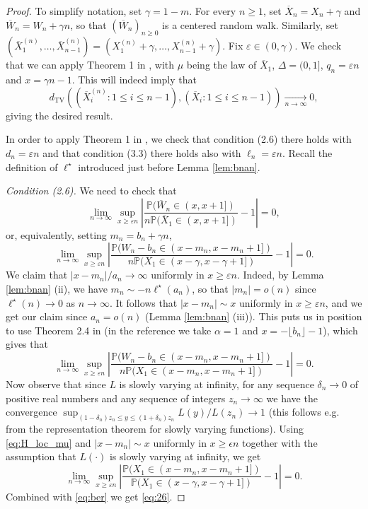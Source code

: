 \documentclass[a4paper,11pt]{article}
\DeclareRobustCommand{\P}{\mathbb{P}}
\DeclareRobustCommand{\to}{\xrightarrow[n\rightarrow \infty]{}}
\begin{document}
\begin{proof}
To simplify notation, set $\gamma=1-m$. For every $n \geq 1$, set $\overline{X}_{n}=X_{n}+\gamma$ and $\overline{W}_{n}=W_{n}+\gamma n$, so that $(\overline{W}_{n})_{n \geq 0}$ is a centered random walk. Similarly, set  $(\overline{X}_1^{(n)}, \ldots ,\overline{X}_{n-1}^{(n)})=(X_1^{(n)}+\gamma, \ldots ,X_{n-1}^{(n)}+\gamma)$. Fix $\varepsilon \in (0,\gamma)$. We check that we can apply Theorem 1 in \cite{AL11}, with $\mu$ being the law of $\overline{X}_{1}$, $\Delta=(0,1]$, $q_{n}=\varepsilon n$ and $x=\gamma n-1$. This will indeed imply that 
$$
                    d_{\mathrm{TV}}\left((\overline{X}_i^{(n)}:1\leq i\leq n-1),(\overline{X}_i:1\leq i\leq n-1)\right) \to 0,
$$
giving the desired result.

In order to apply  Theorem 1 in \cite{AL11}, we check that condition (2.6) there holds with $d_{n}=\varepsilon n$ and that condition (3.3) there holds also with $\ell_{n}=\varepsilon n$. Recall the definition of $\ell^\star$ introduced just before Lemma \ref{lem:bnan}.

\emph{Condition (2.6).} We need to check that
$$
\lim_{n \rightarrow \infty} \sup_{x \geq \varepsilon n} \left| \frac{\P(\overline{W}_{n} \in (x,x+1])}{ n \P(\overline{X}_{1} \in (x,x+1])} -1 \right|=0,
$$
or, equivalently, setting $m_{n}=b_{n}+\gamma n$,
\begin{equation}
\label{eq:26} 
\lim_{n \rightarrow \infty} \sup_{x \geq \varepsilon n} \left| \frac{\P({W}_{n}-b_{n} \in (x-m_{n},x-m_{n}+1])}{ n \P({X}_{1} \in (x-\gamma,x-\gamma+1])} -1 \right|=0.
\end{equation}
We claim that $|x-m_{n}|/a_{n} \rightarrow \infty$  uniformly in $x \geq \varepsilon n$. Indeed, by Lemma \ref{lem:bnan} (ii), we have $m_{n} \sim -n \ell^{\star}(a_{n})$, so that $|m_{n}|=o(n)$ since $\ell^{\star}(n) \rightarrow 0$ as $n \rightarrow \infty$. It follows that $|x-m_{n}| \sim x $  uniformly in $x \geq \varepsilon n$, and we get our claim since $a_n = o(n)$ (Lemma \ref{lem:bnan} (iii)). This puts us in position to use Theorem 2.4 in \cite{Ber17} (in the reference we take $\alpha= 1$ and $x=-\lfloor b_n \rfloor -1$), which gives that 
\begin{equation}
\label{eq:ber}\lim_{n \rightarrow \infty} \sup_{x \geq \varepsilon n} \left| \frac{\P({W}_{n}-b_{n} \in (x-m_{n},x-m_{n}+1])}{ n \P({X}_{1} \in(x-m_{n},x-m_{n}+1])} -1 \right|=0.
\end{equation}
Now observe that since $L$ is slowly varying at infinity, for any sequence $\delta_n \rightarrow 0$ of positive real numbers and any sequence of integers $z_n \rightarrow \infty$ we have the convergence $\sup_{(1-\delta_n) z_n \leq y \leq (1+\delta_n) z_n} L(y)/L(z_n) \rightarrow 1$ (this follows e.g. from the representation theorem for slowly varying functions). Using \eqref{eq:H_loc_mu} and $|x-m_{n}| \sim x$ uniformly in $x\geq \epsilon n$ together with the assumption that $L(\cdot)$ is slowly varying at infinity, we get
$$ \lim_{n \rightarrow \infty} \sup_{x \geq \varepsilon n} \left| \frac{ \P({X}_{1} \in(x-m_{n},x-m_{n}+1])}{  \P({X}_{1} \in(x-\gamma,x-\gamma+1])} -1 \right|=0.$$
Combined with \eqref{eq:ber} we get \eqref{eq:26}.  



\end{proof}
\end{document}
